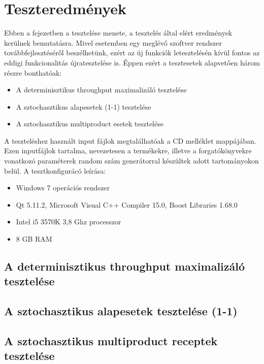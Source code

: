 \chapter{Teszteredmények}
Ebben a fejezetben a tesztelése menete, a tesztelés által elért eredmények kerülnek bemutatásra.
Mivel esetemben egy meglévő szoftver rendszer továbbfejlesztéséről beszélhetünk, ezért az új funkciók letesztelésén kívül fontos az eddigi funkcionalitás újratesztelése is.
Éppen ezért a tesztesetek alapvetően három részre bonthatóak:
\begin{itemize}
\item A determinisztikus throughput maximalizáló tesztelése
\item A sztochasztikus alapesetek (1-1) tesztelése
\item A sztochasztikus multiproduct esetek tesztelése
\end{itemize}
A teszteléshez használt input fájlok megtalálhatóak a CD melléklet  mappájában.
Ezen inputfájlok tartalma, nevezetesen a termékekre, illetve a forgatókönyvekre vonatkozó paraméterek random szám generátorral készültek adott tartományokon belül.
A tesztkonfigurácó leírása:
\begin{itemize}
\item Windows 7 operációs rendszer 
\item Qt 5.11.2, Microsoft Visual C++ Compiler 15.0, Boost Libraries 1.68.0
\item Intel i5 3570K 3,8 Ghz processzor
\item 8 GB RAM
\end{itemize}
\section{A determinisztikus throughput maximalizáló tesztelése}
\section{A sztochasztikus alapesetek tesztelése (1-1)}
\section{A sztochasztikus multiproduct receptek tesztelése}